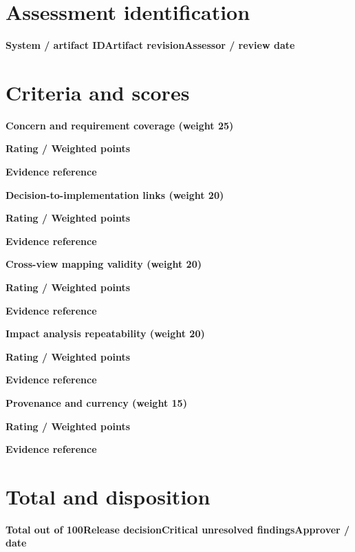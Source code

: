 \documentclass[10pt,letterpaper]{article}
\begin{document}
\DocProvenance
\section{Assessment identification}
\textbf{System / artifact ID}\textbf{Artifact revision}\textbf{Assessor / review date}
\section{Criteria and scores}
\textbf{Concern and requirement coverage (weight 25)}\par\textbf{Rating / Weighted points}\par{}\textbf{Evidence reference}\par{}
\textbf{Decision-to-implementation links (weight 20)}\par\textbf{Rating / Weighted points}\par{}\textbf{Evidence reference}\par{}
\textbf{Cross-view mapping validity (weight 20)}\par\textbf{Rating / Weighted points}\par{}\textbf{Evidence reference}\par{}
\textbf{Impact analysis repeatability (weight 20)}\par\textbf{Rating / Weighted points}\par{}\textbf{Evidence reference}\par{}
\textbf{Provenance and currency (weight 15)}\par\textbf{Rating / Weighted points}\par{}\textbf{Evidence reference}\par{}
\section{Total and disposition}
\textbf{Total out of 100}\textbf{Release decision}\textbf{Critical unresolved findings}\textbf{Approver / date}
\end{document}
